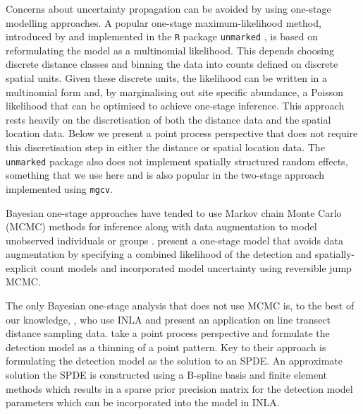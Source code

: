 \documentclass{stylefile16/statsoc}
\begin{document}
Concerns about uncertainty propagation can be avoided by using one-stage modelling approaches.  A popular one-stage maximum-likelihood method, introduced by \cite{royle_ModelingAbundanceEffects_2004} and implemented in the \texttt{R} package \texttt{unmarked} \citep{fiske_UnmarkedPackageFitting_2011}, is based on reformulating the model as a multinomial likelihood.  This depends choosing discrete distance classes and binning the data into counts defined on discrete spatial units.  Given these discrete units, the likelihood can be written in a multinomial form and, by marginalising out site specific abundance, a Poisson likelihood that can be optimised to achieve one-stage inference.  This approach rests heavily on the discretisation of both the distance data and the spatial location data.  Below we present a point process perspective that does not require this discretisation step in either the distance or spatial location data.  The \texttt{unmarked} package also does not implement spatially structured random effects, something that we use here and is also popular in the two-stage approach implemented using \texttt{mgcv}.  

Bayesian one-stage approaches have tended to use Markov chain Monte Carlo (MCMC) methods for inference along with data augmentation to model unobserved individuals or groups \citep{schmidt_using_2012}.  \citet{oedekoven_bayesian_2014} present a one-stage model that avoids data augmentation by specifying a combined likelihood of the detection and spatially-explicit count models and incorporated model uncertainty using reversible jump MCMC.

The only Bayesian one-stage analysis that does not use MCMC is, to the best of our knowledge, \citet{yuan_point_2017}, who use INLA \citep{rue_approximate_2009} and present an application on line transect distance sampling data.  \citet{yuan_point_2017} take a point process perspective and formulate the detection model as a thinning of a point pattern.  Key to their approach is formulating the detection model as the solution to an SPDE.  An approximate solution the SPDE is constructed using a B-spline basis and finite element methods which results in a sparse prior precision matrix for the detection model parameters which can be incorporated into the model in INLA.  
\end{document}
